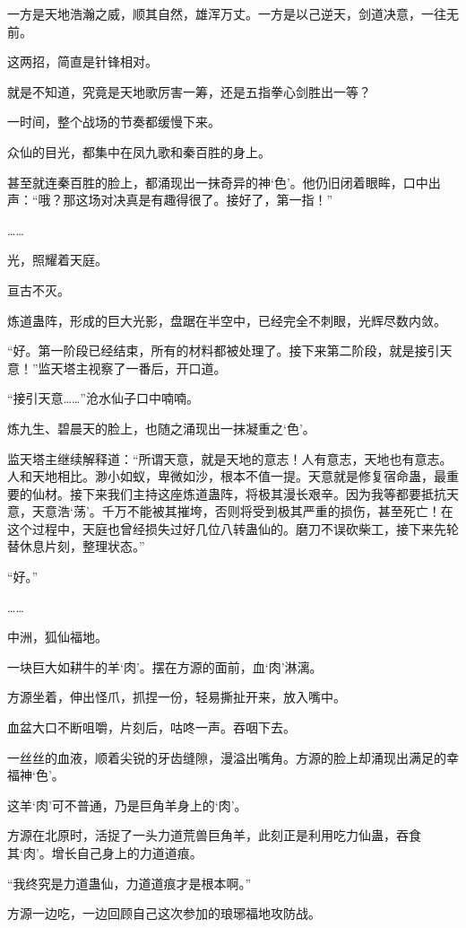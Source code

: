 \begin{this_body}
一方是天地浩瀚之威，顺其自然，雄浑万丈。一方是以己逆天，剑道决意，一往无前。

这两招，简直是针锋相对。

就是不知道，究竟是天地歌厉害一筹，还是五指拳心剑胜出一等？

一时间，整个战场的节奏都缓慢下来。

众仙的目光，都集中在凤九歌和秦百胜的身上。

甚至就连秦百胜的脸上，都涌现出一抹奇异的神‘色’。他仍旧闭着眼眸，口中出声：“哦？那这场对决真是有趣得很了。接好了，第一指！”

……

光，照耀着天庭。

亘古不灭。

炼道蛊阵，形成的巨大光影，盘踞在半空中，已经完全不刺眼，光辉尽数内敛。

“好。第一阶段已经结束，所有的材料都被处理了。接下来第二阶段，就是接引天意！”监天塔主视察了一番后，开口道。

“接引天意……”沧水仙子口中喃喃。

炼九生、碧晨天的脸上，也随之涌现出一抹凝重之‘色’。

监天塔主继续解释道：“所谓天意，就是天地的意志！人有意志，天地也有意志。人和天地相比。渺小如蚁，卑微如沙，根本不值一提。天意就是修复宿命蛊，最重要的仙材。接下来我们主持这座炼道蛊阵，将极其漫长艰辛。因为我等都要抵抗天意，天意浩‘荡’。千万不能被其摧垮，否则将受到极其严重的损伤，甚至死亡！在这个过程中，天庭也曾经损失过好几位八转蛊仙的。磨刀不误砍柴工，接下来先轮替休息片刻，整理状态。”

“好。”

……

中洲，狐仙福地。

一块巨大如耕牛的羊‘肉’。摆在方源的面前，血‘肉’淋漓。

方源坐着，伸出怪爪，抓捏一份，轻易撕扯开来，放入嘴中。

血盆大口不断咀嚼，片刻后，咕咚一声。吞咽下去。

一丝丝的血液，顺着尖锐的牙齿缝隙，漫溢出嘴角。方源的脸上却涌现出满足的幸福神‘色’。

这羊‘肉’可不普通，乃是巨角羊身上的‘肉’。

方源在北原时，活捉了一头力道荒兽巨角羊，此刻正是利用吃力仙蛊，吞食其‘肉’。增长自己身上的力道道痕。

“我终究是力道蛊仙，力道道痕才是根本啊。”

方源一边吃，一边回顾自己这次参加的琅琊福地攻防战。


\end{this_body}

